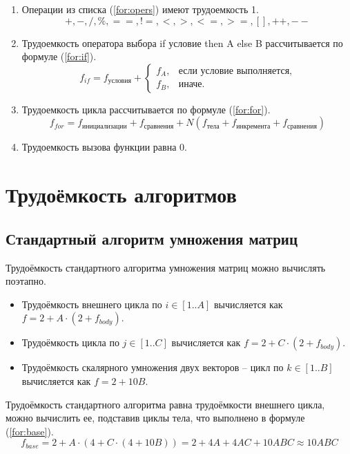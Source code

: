 \begin{enumerate}
	\item Операции из списка (\ref{for:opers}) имеют трудоемкость 1.
	\begin{equation}
	\label{for:opers}
	+, -, /, \%, ==, !=, <, >, <=, >=, [], ++, {-}-
	\end{equation}
	\item Трудоемкость оператора выбора if условие then A else B рассчитывается по формуле (\ref{for:if}).
	\begin{equation}
	\label{for:if}
	f_{if} = f_{\text{условия}} +
	\begin{cases}
	f_A, & \text{если условие выполняется,}\\
	f_B, & \text{иначе.}
	\end{cases}
	\end{equation}
	\item Трудоемкость цикла рассчитывается по формуле (\ref{for:for}).
	\begin{equation}
	\label{for:for}
	f_{for} = f_{\text{инициализации}} + f_{\text{сравнения}} + N(f_{\text{тела}} + f_{\text{инкремента}} + f_{\text{сравнения}})
	\end{equation}
	\item Трудоемкость вызова функции равна 0.
\end{enumerate}

\section{Трудоёмкость алгоритмов}

\subsection{Стандартный алгоритм умножения матриц}

Трудоёмкость стандартного алгоритма умножения матриц можно вычислять поэтапно.
\begin{itemize}
	\item Трудоёмкость внешнего цикла по $i \in [1..A]$ вычисляется как $f = 2 + A \cdot (2 + f_{body})$.
	\item Трудоёмкость цикла по $j \in [1..C]$ вычисляется как $f = 2 + C \cdot (2 + f_{body})$.
	\item Трудоёмкость скалярного умножения двух векторов -- цикл по $k \in [1..B]$ вычисляется как $f = 2 + 10B$.
\end{itemize}

Трудоёмкость стандартного алгоритма равна трудоёмкости внешнего цикла, можно вычислить ее, подставив циклы тела, что выполнено в формуле (\ref{for:base}).
\begin{equation}
	\label{for:base}
	f_{base} = 2 + A \cdot (4 + C \cdot (4 + 10B)) = 2 + 4A + 4AC + 10ABC \approx 10ABC
\end{equation}

